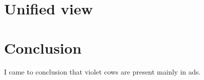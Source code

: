 \documentclass[11pt,oneside,draft]{fithesis2}
\begin{document}
\chapter{Unified view}


\chapter{Conclusion}

I came to conclusion that violet cows are present mainly in ads.



\end{document}
